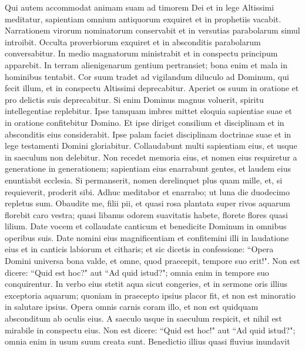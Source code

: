 \begin{biblechapter}  
\verse Qui autem accommodat animam suam ad timorem Dei et in lege Altissimi meditatur, sapientiam omnium antiquorum exquiret et in prophetiis vacabit. 
\verse Narrationem virorum nominatorum conservabit et in versutias parabolarum simul introibit. 
\verse Occulta proverbiorum exquiret et in absconditis parabolarum conversabitur. 
\verse In medio magnatorum ministrabit et in conspectu principum apparebit. 
\verse In terram alienigenarum gentium pertransiet; bona enim et mala in hominibus tentabit. 
\verse Cor suum tradet ad vigilandum diluculo ad Dominum, qui fecit illum, et in conspectu Altissimi deprecabitur. 
\verse Aperiet os suum in oratione et pro delictis suis deprecabitur. 
\verse Si enim Dominus magnus voluerit, spiritu intellegentiae replebitur. 
\verse Ipse tamquam imbres mittet eloquia sapientiae suae et in oratione confitebitur Domino. 
\verse Et ipse diriget consilium et disciplinam et in absconditis eius considerabit. 
\verse Ipse palam faciet disciplinam doctrinae suae et in lege testamenti Domini gloriabitur. 
\verse Collaudabunt multi sapientiam eius, et usque in saeculum non delebitur. 
\verse Non recedet memoria eius, et nomen eius requiretur a generatione in generationem; 
\verse sapientiam eius enarrabunt gentes, et laudem eius enuntiabit ecclesia. 
\verse Si permanserit, nomen derelinquet plus quam mille, et, si requieverit, proderit sibi. 
\verse Adhuc meditabor et enarrabo; ut luna die duodecimo repletus sum. 
\verse Obaudite me, filii pii, et quasi rosa plantata super rivos aquarum florebit caro vestra; 
\verse quasi libanus odorem suavitatis habete, 
\verse florete flores quasi lilium. Date vocem et collaudate canticum et benedicite Dominum in omnibus operibus suis. 
\verse Date nomini eius magnificentiam et confitemini illi in laudatione eius et in canticis labiorum et citharis; et sic dicetis in confessione: 
\verse “Opera Domini universa bona valde, et omne, quod praecepit, tempore suo erit!". Non est dicere: “Quid est hoc?" aut “Ad quid istud?"; omnia enim in tempore suo conquirentur. 
\verse In verbo eius stetit aqua sicut congeries, et in sermone oris illius exceptoria aquarum; 
\verse quoniam in praecepto ipsius placor fit, et non est minoratio in salutare ipsius. 
\verse Opera omnis carnis coram illo, et non est quidquam absconditum ab oculis eius. 
\verse A saeculo usque in saeculum respicit, et nihil est mirabile in conspectu eius. 
\verse Non est dicere: “Quid est hoc!" aut “Ad quid istud?"; omnia enim in usum suum creata sunt. 
\verse Benedictio illius quasi fluvius inundavit 

\end{biblechapter}
